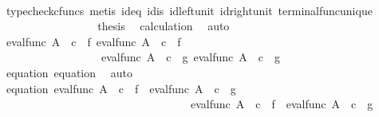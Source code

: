 \begin{isabellebody}
\ \ \ \ \ \ \ \ \ \ \ \ \ \ \ \ \isamarkupfalse%
\ {\isacharparenleft}{\kern0pt}typecheck{\isacharunderscore}{\kern0pt}cfuncs{\isacharcomma}{\kern0pt}\ metis\ id{}{\isacharunderscore}{\kern0pt}eq\ id{}{\isacharunderscore}{\kern0pt}is\ id{\isacharunderscore}{\kern0pt}left{\isacharunderscore}{\kern0pt}unit{}\ id{\isacharunderscore}{\kern0pt}right{\isacharunderscore}{\kern0pt}unit{}\ terminal{\isacharunderscore}{\kern0pt}func{\isacharunderscore}{\kern0pt}unique{\isacharparenright}{\kern0pt}\isanewline
\ \ \ \ \ \ \ \ \ \ \ \ \ \ \isamarkupfalse%
\ \isamarkupfalse%
\ {\isacharquery}{\kern0pt}thesis\ \isamarkupfalse%
\ calculation\ \isamarkupfalse%
\ auto\isanewline
\ \ \ \ \ \ \ \ \ \isamarkupfalse%
\isanewline
\ \ \ \ \ \ \ \ \ \ \ \ \isamarkupfalse%
\ {\isachardoublequoteopen}{\isasymlangle}eval{\isacharunderscore}{\kern0pt}func\ A\ {\isasymOmega}\ {\isasymcirc}\isactrlsub c\ {\isasymlangle}{\isasymt}{\isacharcomma}{\kern0pt}\ f{\isasymrangle}{\isacharcomma}{\kern0pt}\ eval{\isacharunderscore}{\kern0pt}func\ A\ {\isasymOmega}\ {\isasymcirc}\isactrlsub c\ {\isasymlangle}{\isasymf}{\isacharcomma}{\kern0pt}\ f{\isasymrangle}{\isasymrangle}\ {\isacharequal}{\kern0pt}\ \isanewline
\ \ \ \ \ \ \ \ \ \ \ \ \ \ \ \ \ \ {\isasymlangle}eval{\isacharunderscore}{\kern0pt}func\ A\ {\isasymOmega}\ {\isasymcirc}\isactrlsub c\ {\isasymlangle}{\isasymt}{\isacharcomma}{\kern0pt}\ g{\isasymrangle}{\isacharcomma}{\kern0pt}\ eval{\isacharunderscore}{\kern0pt}func\ A\ {\isasymOmega}\ {\isasymcirc}\isactrlsub c\ {\isasymlangle}{\isasymf}{\isacharcomma}{\kern0pt}\ g{\isasymrangle}{\isasymrangle}{\isachardoublequoteclose}\isanewline
\ \ \ \ \ \ \ \ \ \ \ \ \ \ \isamarkupfalse%
\ equation{}\ equation{}\ \isamarkupfalse%
\ auto\isanewline
\ \ \ \ \ \ \ \ \ \ \ \ \isamarkupfalse%
\ \isamarkupfalse%
\ equation{}{\isacharcolon}{\kern0pt}\ {\isachardoublequoteopen}{\isacharparenleft}{\kern0pt}eval{\isacharunderscore}{\kern0pt}func\ A\ {\isasymOmega}\ {\isasymcirc}\isactrlsub c\ {\isasymlangle}{\isasymt}{\isacharcomma}{\kern0pt}\ f{\isasymrangle}\ {\isacharequal}{\kern0pt}\ eval{\isacharunderscore}{\kern0pt}func\ A\ {\isasymOmega}\ {\isasymcirc}\isactrlsub c\ {\isasymlangle}{\isasymt}{\isacharcomma}{\kern0pt}\ g{\isasymrangle}{\isacharparenright}{\kern0pt}\ {\isasymand}\ \isanewline
\ \ \ \ \ \ \ \ \ \ \ \ \ \ \ \ \ \ \ \ \ \ \ \ \ \ \ \ \ \ \ \ \ \ {\isacharparenleft}{\kern0pt}eval{\isacharunderscore}{\kern0pt}func\ A\ {\isasymOmega}\ {\isasymcirc}\isactrlsub c\ {\isasymlangle}{\isasymf}{\isacharcomma}{\kern0pt}\ f{\isasymrangle}\ {\isacharequal}{\kern0pt}\ eval{\isacharunderscore}{\kern0pt}func\ A\ {\isasymOmega}\ {\isasymcirc}\isactrlsub c\ {\isasymlangle}{\isasymf}{\isacharcomma}{\kern0pt}\ g{\isasymrangle}{\isacharparenright}{\kern0pt}{\isachardoublequoteclose}\isanewline

\end{isabellebody}
